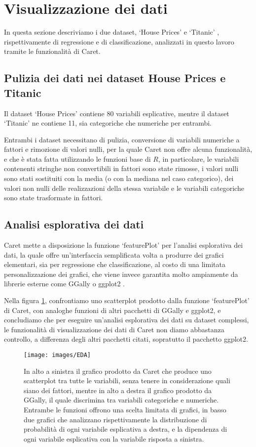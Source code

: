 \documentclass[12pt]{article}
\begin{document}
\section{Visualizzazione dei dati}
\label{sec:vis_data}
In questa sezione descriviamo i due dataset, ‘House Prices’ \cite{cit:houseprices} e ‘Titanic’ \cite{cit:titanic}, rispettivamente di regressione e di classificazione,
 analizzati in questo lavoro tramite le funzionalità di Caret.
\subsection{Pulizia dei dati nei dataset House Prices e Titanic}
Il dataset ‘House Prices’ contiene 80 variabili esplicative, mentre il dataset ‘Titanic’ ne contiene 11, sia categoriche che numeriche per entrambi.

Entrambi i dataset necessitano di pulizia, conversione di variabili numeriche a fattori e rimozione di valori nulli, per la quale Caret non offre alcuna funzionalità, e che è stata fatta 
utilizzando le funzioni base di $R$, in particolare, le variabili contenenti stringhe non convertibili in fattori sono state rimosse, i valori nulli sono stati sostituiti con la media (o con la mediana nel caso categorico), 
dei valori non nulli delle realizzazioni della stessa variabile e le variabili categoriche sono state trasformate in fattori.

\subsection{Analisi esplorativa dei dati}
Caret mette a disposizione la funzione ‘featurePlot’ per l'analisi esplorativa dei dati, la quale offre un'interfaccia semplificata volta a 
produrre dei grafici elementari, sia per regressione che classificazione, al costo di una limitata personalizzazione dei grafici, che viene invece garantita molto ampiamente da librerie esterne come GGally \cite{cit:GGally} o ggplot2 \cite{cit:ggplot2}.

Nella figura \ref{img:EDA}, confrontiamo uno scatterplot prodotto dalla funzione ‘featurePlot’ di Caret, con analoghe funzioni di altri pacchetti di GGally e ggplot2, e concludiamo che per eseguire un'analisi esplorativa dei dati su dataset complessi, le 
funzionalità di visualizzazione dei dati di Caret non diamo abbastanza controllo, a differenza degli altri pacchetti citati, sopratutto il pacchetto ggplot2.

\begin{figure}[H]
    \centering
    \texttt{[image: images/EDA]}
    \caption{In alto a sinistra il grafico prodotto da Caret che produce uno scatterplot tra tutte le variabili, senza tenere in considerazione quali siano dei fattori, mentre
     in alto a destra il grafico prodotto da GGally, il quale discrimina tra variabili categoriche e numeriche. Entrambe le funzioni offrono una scelta limitata di grafici, in basso 
     due grafici che analizzano rispettivamente la distribuzione di probabilità di ogni variabile esplicativa a destra, e la dipendenza di ogni variabile esplicativa con la variabile risposta a sinistra.}
    \label{img:EDA}
\end{figure}
\end{document}
